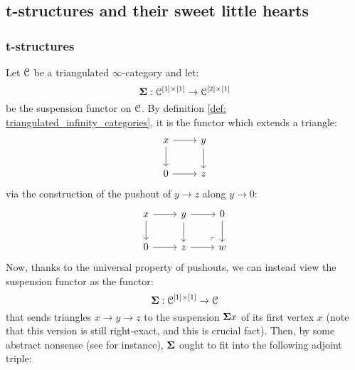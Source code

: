         \subsection{t-structures and their sweet little hearts}
            \subsubsection{t-structures}
                \begin{remark} \label{remark: suspensions_and_loops}
                    Let $\mathcal{C}$ be a triangulated $\infty$-category and let:
                        $$\suspension: \C^{[1] \x [1]} \to \C^{[2] \x [1]}$$
                    be the suspension functor on $\mathcal{C}$. By definition \ref{def: triangulated_infinity_categories}, it is the functor which extends a triangle:
                        $$
                            \begin{tikzcd}
                            	x & y \\
                            	0 & z
                            	\arrow[from=1-1, to=2-1]
                            	\arrow[from=1-1, to=1-2]
                            	\arrow[from=1-2, to=2-2]
                            	\arrow[from=2-1, to=2-2]
                            \end{tikzcd}
                        $$
                    via the construction of the pushout of $y \to z$ along $y \to 0$:
                        $$
                            \begin{tikzcd}
                            	x & y & 0 \\
                            	0 & z & w
                            	\arrow[from=1-1, to=2-1]
                            	\arrow[from=1-1, to=1-2]
                            	\arrow[from=1-2, to=2-2]
                            	\arrow[from=2-1, to=2-2]
                            	\arrow[from=1-2, to=1-3]
                            	\arrow[from=1-3, to=2-3]
                            	\arrow[from=2-2, to=2-3]
                            	\arrow["\lrcorner"{anchor=center, pos=0.125, rotate=180}, draw=none, from=2-3, to=1-2]
                            \end{tikzcd}
                        $$
                    Now, thanks to the universal property of pushouts, we can instead view the suspension functor as the functor:
                        $$\suspension: \C^{[1] \x [1]} \to \C$$
                    that sends triangles $x \to y \to z$ to the suspension $\mathbf{\Sigma} x$ of its first vertex $x$ (note that this version is still right-exact, and this is crucial fact). Then, by some abstract nonsense (see \cite[Section 3]{nlab:infinity-1-limit} for instance), $\mathbf{\Sigma}$ ought to fit into the following adjoint triple:

\end{remark}
